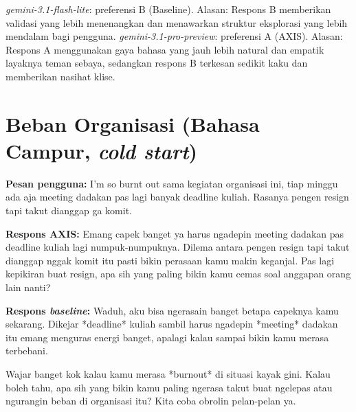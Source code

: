 \textit{gemini-3.1-flash-lite}: preferensi B (Baseline). Alasan: Respons B memberikan validasi yang lebih menenangkan dan menawarkan struktur eksplorasi yang lebih mendalam bagi pengguna.\newline
\textit{gemini-3.1-pro-preview}: preferensi A (AXIS). Alasan: Respons A menggunakan gaya bahasa yang jauh lebih natural dan empatik layaknya teman sebaya, sedangkan respons B terkesan sedikit kaku dan memberikan nasihat klise.\newline

\section{Beban Organisasi (Bahasa Campur, \textit{cold start})}

\textbf{Pesan pengguna:} I'm so burnt out sama kegiatan organisasi ini, tiap minggu ada aja meeting dadakan pas lagi banyak deadline kuliah. Rasanya pengen resign tapi takut dianggap ga komit.

\textbf{Respons AXIS:} Emang capek banget ya harus ngadepin meeting dadakan pas deadline kuliah lagi numpuk-numpuknya. Dilema antara pengen resign tapi takut dianggap nggak komit itu pasti bikin perasaan kamu makin keganjal. Pas lagi kepikiran buat resign, apa sih yang paling bikin kamu cemas soal anggapan orang lain nanti?

\textbf{Respons \textit{baseline}:} Waduh, aku bisa ngerasain banget betapa capeknya kamu sekarang. Dikejar *deadline* kuliah sambil harus ngadepin *meeting* dadakan itu emang menguras energi banget, apalagi kalau sampai bikin kamu merasa terbebani.

Wajar banget kok kalau kamu merasa *burnout* di situasi kayak gini. Kalau boleh tahu, apa sih yang bikin kamu paling ngerasa takut buat ngelepas atau ngurangin beban di organisasi itu? Kita coba obrolin pelan-pelan ya.

